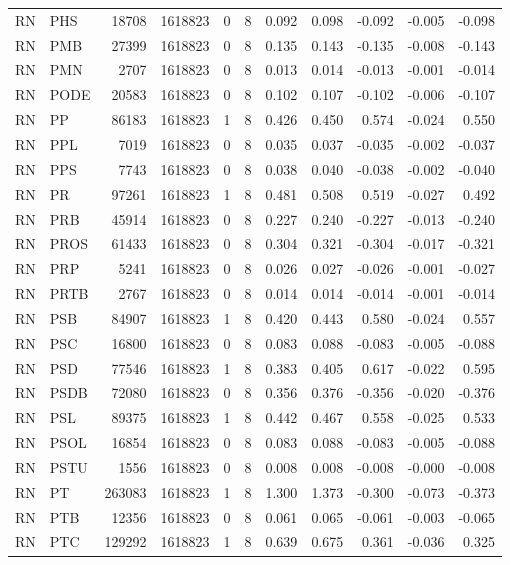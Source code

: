 \begin{landscape}
\begin{longtable}{llrrrrrrrrr}
RN & PHS & 18708 & 1618823 & 0 & 8 & 0.092 & 0.098 & -0.092 & -0.005 & -0.098 \\
RN & PMB & 27399 & 1618823 & 0 & 8 & 0.135 & 0.143 & -0.135 & -0.008 & -0.143 \\
RN & PMN & 2707 & 1618823 & 0 & 8 & 0.013 & 0.014 & -0.013 & -0.001 & -0.014 \\
RN & PODE & 20583 & 1618823 & 0 & 8 & 0.102 & 0.107 & -0.102 & -0.006 & -0.107 \\
RN & PP & 86183 & 1618823 & 1 & 8 & 0.426 & 0.450 & 0.574 & -0.024 & 0.550 \\
RN & PPL & 7019 & 1618823 & 0 & 8 & 0.035 & 0.037 & -0.035 & -0.002 & -0.037 \\
RN & PPS & 7743 & 1618823 & 0 & 8 & 0.038 & 0.040 & -0.038 & -0.002 & -0.040 \\
RN & PR & 97261 & 1618823 & 1 & 8 & 0.481 & 0.508 & 0.519 & -0.027 & 0.492 \\
RN & PRB & 45914 & 1618823 & 0 & 8 & 0.227 & 0.240 & -0.227 & -0.013 & -0.240 \\
RN & PROS & 61433 & 1618823 & 0 & 8 & 0.304 & 0.321 & -0.304 & -0.017 & -0.321 \\
RN & PRP & 5241 & 1618823 & 0 & 8 & 0.026 & 0.027 & -0.026 & -0.001 & -0.027 \\
RN & PRTB & 2767 & 1618823 & 0 & 8 & 0.014 & 0.014 & -0.014 & -0.001 & -0.014 \\
RN & PSB & 84907 & 1618823 & 1 & 8 & 0.420 & 0.443 & 0.580 & -0.024 & 0.557 \\
RN & PSC & 16800 & 1618823 & 0 & 8 & 0.083 & 0.088 & -0.083 & -0.005 & -0.088 \\
RN & PSD & 77546 & 1618823 & 1 & 8 & 0.383 & 0.405 & 0.617 & -0.022 & 0.595 \\
RN & PSDB & 72080 & 1618823 & 0 & 8 & 0.356 & 0.376 & -0.356 & -0.020 & -0.376 \\
RN & PSL & 89375 & 1618823 & 1 & 8 & 0.442 & 0.467 & 0.558 & -0.025 & 0.533 \\
RN & PSOL & 16854 & 1618823 & 0 & 8 & 0.083 & 0.088 & -0.083 & -0.005 & -0.088 \\
RN & PSTU & 1556 & 1618823 & 0 & 8 & 0.008 & 0.008 & -0.008 & -0.000 & -0.008 \\
RN & PT & 263083 & 1618823 & 1 & 8 & 1.300 & 1.373 & -0.300 & -0.073 & -0.373 \\
RN & PTB & 12356 & 1618823 & 0 & 8 & 0.061 & 0.065 & -0.061 & -0.003 & -0.065 \\
RN & PTC & 129292 & 1618823 & 1 & 8 & 0.639 & 0.675 & 0.361 & -0.036 & 0.325 \\

\end{longtable}
\end{landscape}
